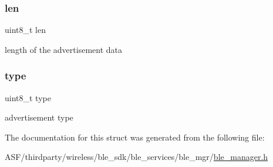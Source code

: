 \mbox{\label{structadv__element_a5723e60ffd628510c699eddbce90be23}} 
\subsubsection{\texorpdfstring{len}{len}}
{\footnotesize\ttfamily uint8\+\_\+t len}



length of the advertisement data 

\mbox{\label{structadv__element_a1d127017fb298b889f4ba24752d08b8e}} 
\subsubsection{\texorpdfstring{type}{type}}
{\footnotesize\ttfamily uint8\+\_\+t type}



advertisement type 



The documentation for this struct was generated from the following file\+:\begin{DoxyCompactItemize}
\item 
A\+S\+F/thirdparty/wireless/ble\+\_\+sdk/ble\+\_\+services/ble\+\_\+mgr/\mbox{\hyperlink{ble__manager_8h}{ble\+\_\+manager.\+h}}\end{DoxyCompactItemize}
